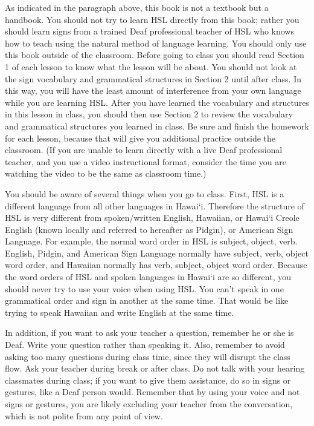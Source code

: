 \documentclass{tufte-book}
\begin{document}
As indicated in the paragraph above, this book is not a textbook but a handbook. You should not try to learn HSL directly from this book; rather you should learn signs from a trained Deaf professional teacher of HSL who knows how to teach using the natural method of language learning. You should only use this book outside of the classroom. Before going to class you should read Section 1 of each lesson to know what the lesson will be about. You should not look at the sign vocabulary and grammatical structures in Section 2 until after class. In this way, you will have the least amount of interference from your own language while you are learning HSL. After you have learned the vocabulary and structures in this lesson in class, you should then use Section 2 to review the vocabulary and grammatical structures you learned in class. Be sure and finish the homework for each lesson, because that will give you additional practice outside the classroom. (If you are unable to learn directly with a live Deaf professional teacher, and you use a video instructional format, consider the time you are watching the video to be the same as classroom time.)

You should be aware of several things when you go to class. First, HSL is a different language from all other languages in Hawai`i. Therefore the structure of HSL is very different from spoken/written English, Hawaiian, or Hawai`i Creole English (known locally  and referred to hereafter as Pidgin), or American Sign Language. For example, the normal word order in HSL is subject, object, verb. English, Pidgin, and American Sign Language normally have subject, verb, object word order, and Hawaiian normally has verb, subject, object word order. Because the word orders of HSL and spoken languages in Hawai`i are so different, you should never try to use your voice when using HSL. You can’t speak in one grammatical order and sign in another at the same time. That would be like trying to speak Hawaiian and write English at the same time.%

In addition, if you want to ask your teacher a question, remember he or she is Deaf. Write your question rather than speaking it. Also, remember to avoid asking too many questions during class time, since they will disrupt the class flow. Ask your teacher during break or after class. Do not talk with your hearing classmates during class; if you want to give them assistance, do so in signs or gestures, like a Deaf person would. Remember that by using your voice and not signs or gestures, you are likely excluding your teacher from the conversation, which is not polite from any point of view.
\end{document}
